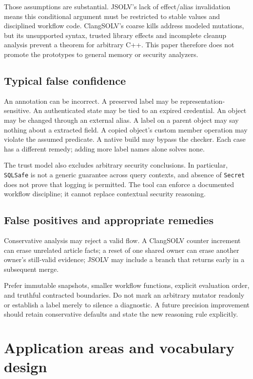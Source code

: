\documentclass[11pt]{article}
\begin{document}
Those assumptions are substantial. JSOLV's lack of effect/alias invalidation
means this conditional argument must be restricted to stable values and
disciplined workflow code. ClangSOLV's coarse kills address modeled mutations,
but its unsupported syntax, trusted library effects and incomplete cleanup
analysis prevent a theorem for arbitrary C++. This paper therefore does not
promote the prototypes to general memory or security analyzers.

\subsection{Typical false confidence}
An annotation can be incorrect. A preserved label may be representation-sensitive.
An authenticated state may be tied to an expired credential. An object may
be changed through an external alias. A label on a parent object may say
nothing about a extracted field. A copied object's custom member operation
may violate the assumed predicate. A native build may bypass the checker.
Each case has a different remedy; adding more label names alone solves none.

The trust model also excludes arbitrary security conclusions. In particular,
\texttt{SQLSafe} is not a generic guarantee across query contexts, and absence
of \texttt{Secret} does not prove that logging is permitted. The tool can
enforce a documented workflow discipline; it cannot replace contextual security
reasoning.

\subsection{False positives and appropriate remedies}
Conservative analysis may reject a valid flow. A ClangSOLV counter increment
can erase unrelated article facts; a reset of one shared owner can erase
another owner's still-valid evidence; JSOLV may include a branch that returns
early in a subsequent merge.

Prefer immutable snapshots, smaller workflow functions, explicit evaluation
order, and truthful contracted boundaries. Do not mark an arbitrary mutator
readonly or establish a label merely to silence a diagnostic. A future
precision improvement should retain conservative defaults and state the
new reasoning rule explicitly.

\section{Application areas and vocabulary design}
\end{document}
